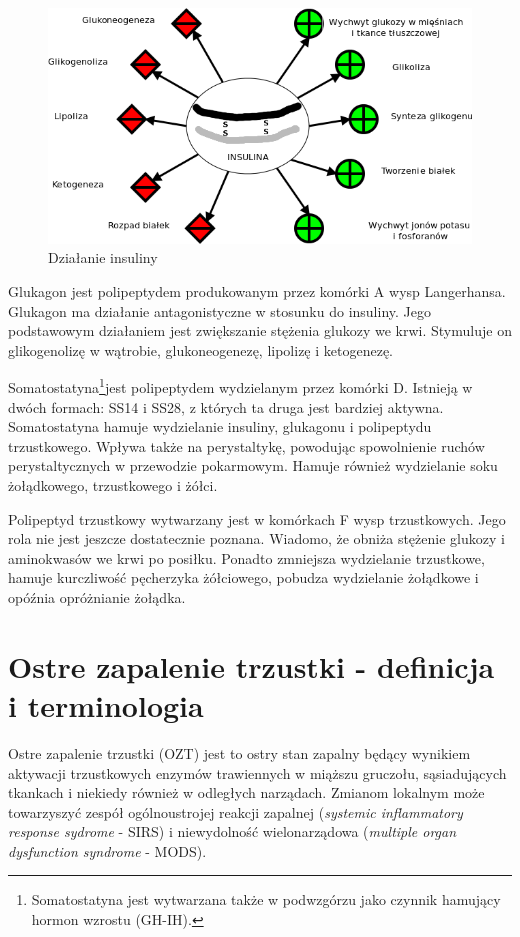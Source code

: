 \documentclass[a4paper, 12pt]{report}
\begin{document}
\begin{figure}[h]
\centering
\includegraphics[scale=0.5]{Insulina_diag2}
\caption{Działanie insuliny}
\end{figure}

Glukagon jest polipeptydem produkowanym przez komórki A wysp
Langerhansa. Glukagon ma działanie antagonistyczne w stosunku do
insuliny. Jego podstawowym działaniem jest zwiększanie stężenia
glukozy we krwi. Stymuluje on glikogenolizę w wątrobie,
glukoneogenezę, lipolizę i ketogenezę.

Somatostatyna\footnote{ Somatostatyna jest wytwarzana także w
  podwzgórzu jako czynnik hamujący hormon wzrostu (GH-IH).}jest
polipeptydem wydzielanym przez komórki D. Istnieją w dwóch formach:
SS14 i SS28, z których ta druga jest bardziej aktywna. Somatostatyna
hamuje wydzielanie insuliny, glukagonu i polipeptydu
trzustkowego. Wpływa także na perystaltykę, powodując spowolnienie
ruchów perystaltycznych w przewodzie pokarmowym. Hamuje również
wydzielanie soku żołądkowego, trzustkowego i żółci.

Polipeptyd trzustkowy wytwarzany jest w komórkach F wysp trzustkowych. Jego
rola nie jest jeszcze dostatecznie poznana. Wiadomo, że obniża
stężenie glukozy i aminokwasów we krwi po posiłku. Ponadto zmniejsza
wydzielanie trzustkowe, hamuje kurczliwość pęcherzyka żółciowego,
pobudza wydzielanie żołądkowe i opóźnia opróżnianie żołądka.

\chapter{Ostre zapalenie trzustki - definicja i terminologia}

Ostre zapalenie trzustki (OZT) jest to ostry stan zapalny będący
wynikiem aktywacji trzustkowych enzymów trawiennych w miąższu
gruczołu, sąsiadujących tkankach i niekiedy również w odległych
narządach.  Zmianom lokalnym może towarzyszyć zespół ogólnoustrojej
reakcji zapalnej (\textsl{systemic inflammatory response sydrome} -
SIRS) i niewydolność wielonarządowa (\textsl{multiple organ
  dysfunction syndrome} - MODS).
\end{document}
